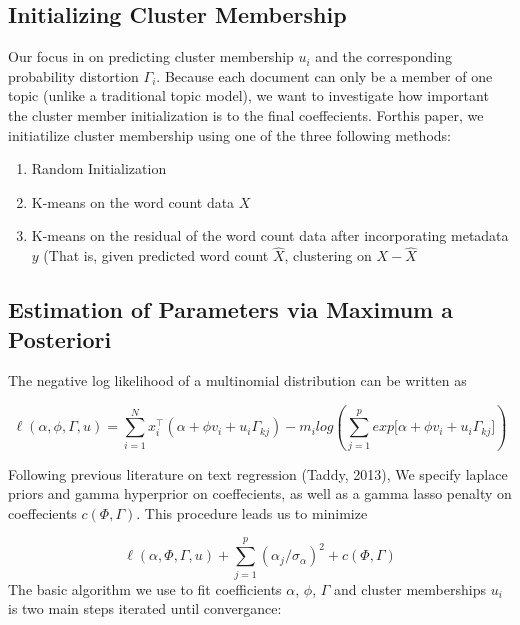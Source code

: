 \documentclass[12pt]{article}
\begin{document}
\subsection{Initializing Cluster Membership}

Our focus in on predicting cluster membership $u_i$ and the
corresponding probability distortion $\Gamma_i$. Because each document can only be a member of one topic (unlike a traditional topic model), we want to investigate how important the cluster member initialization is to the final coeffecients. 
Forthis paper, we initiatilize cluster membership using one of the three following
methods:

\begin{enumerate}
\def\labelenumi{\arabic{enumi}.}
\itemsep1pt\parskip0pt
\item
  Random Initialization
\item
  K-means on the word count data $X$
\item
  K-means on the residual of the word count data after incorporating
  metadata $y$ (That is, given predicted word count $\hat{X}$,
  clustering on $X-\hat{X}$
\end{enumerate}

\subsection{Estimation of Parameters via Maximum a
Posteriori}\label{estimation-of-parameters-via-maximum-a-posteriori}

The negative log likelihood of a multinomial distribution can be written
as

\begin{equation} 
\ell(\alpha,\phi,\Gamma,u) = \sum_{i = 1}^{N}{ x_i^\top (\alpha + \phi v_i + u_i \Gamma_{kj})} - m_i log(\sum_{j = 1}^{p}{exp{\big[ \alpha + \phi v_i + u_i \Gamma_{kj} \big]}})
\end{equation}

Following previous literature on text regression (Taddy, 2013), We specify laplace priors and gamma hyperprior on coeffecients, as well as a gamma lasso penalty on coeffecients $c(\Phi,\Gamma)$. This
procedure leads us to minimize

\begin{equation}
\ell(\alpha,\Phi,\Gamma,u) + \sum_{j=1}^{p}(\alpha_j/ \sigma_\alpha)^2 + c(\Phi,\Gamma) 
\end{equation}
The basic algorithm we use to fit coefficients $\alpha$, $\phi$, $\Gamma$
and cluster memberships $u_i$ is two main steps iterated until
convergance:
\end{document}
